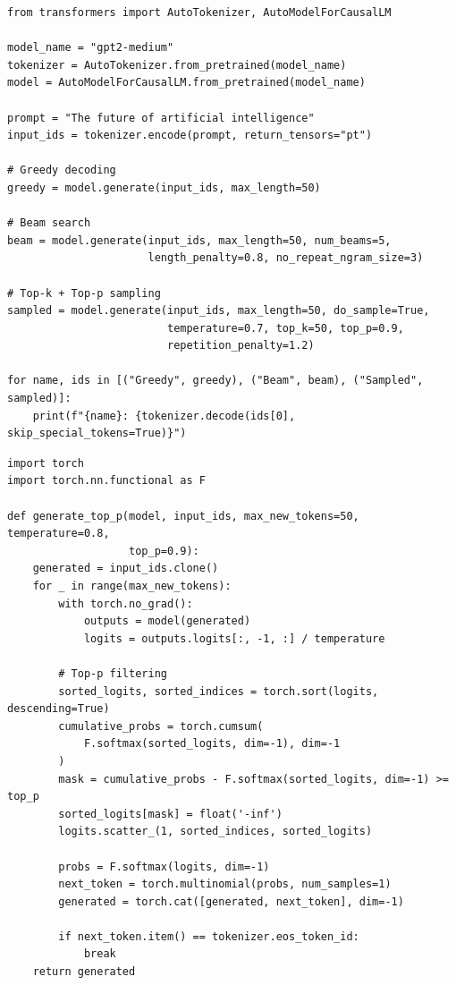 \begin{codeblock}[title=\textbf{Decoding strategies with Hugging Face}]
\begin{verbatim}
from transformers import AutoTokenizer, AutoModelForCausalLM

model_name = "gpt2-medium"
tokenizer = AutoTokenizer.from_pretrained(model_name)
model = AutoModelForCausalLM.from_pretrained(model_name)

prompt = "The future of artificial intelligence"
input_ids = tokenizer.encode(prompt, return_tensors="pt")

# Greedy decoding
greedy = model.generate(input_ids, max_length=50)

# Beam search
beam = model.generate(input_ids, max_length=50, num_beams=5,
                      length_penalty=0.8, no_repeat_ngram_size=3)

# Top-k + Top-p sampling
sampled = model.generate(input_ids, max_length=50, do_sample=True,
                         temperature=0.7, top_k=50, top_p=0.9,
                         repetition_penalty=1.2)

for name, ids in [("Greedy", greedy), ("Beam", beam), ("Sampled", sampled)]:
    print(f"{name}: {tokenizer.decode(ids[0], skip_special_tokens=True)}")
\end{verbatim}
\end{codeblock}

\begin{codeblock}[title=\textbf{Step-by-step decoding}]
\begin{verbatim}
import torch
import torch.nn.functional as F

def generate_top_p(model, input_ids, max_new_tokens=50, temperature=0.8,
                   top_p=0.9):
    generated = input_ids.clone()
    for _ in range(max_new_tokens):
        with torch.no_grad():
            outputs = model(generated)
            logits = outputs.logits[:, -1, :] / temperature

        # Top-p filtering
        sorted_logits, sorted_indices = torch.sort(logits, descending=True)
        cumulative_probs = torch.cumsum(
            F.softmax(sorted_logits, dim=-1), dim=-1
        )
        mask = cumulative_probs - F.softmax(sorted_logits, dim=-1) >= top_p
        sorted_logits[mask] = float('-inf')
        logits.scatter_(1, sorted_indices, sorted_logits)

        probs = F.softmax(logits, dim=-1)
        next_token = torch.multinomial(probs, num_samples=1)
        generated = torch.cat([generated, next_token], dim=-1)

        if next_token.item() == tokenizer.eos_token_id:
            break
    return generated
\end{verbatim}
\end{codeblock}

